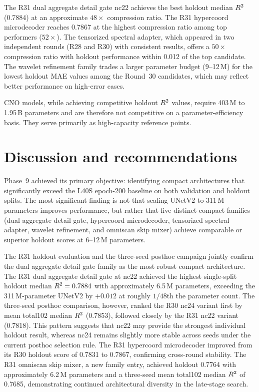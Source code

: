 ﻿\documentclass[preprint,12pt,authoryear]{elsarticle}
\newcommand{\rTwo}{R\textsuperscript{2}}
\begin{document}
The R31 dual aggregate detail gate nc22 achieves the best holdout median $\rTwo{}$ (0.7884) at an approximate $48\times$ compression ratio.
The R31 hypercoord microdecoder reaches 0.7867 at the highest compression ratio among top performers ($52\times$).
The tensorized spectral adapter, which appeared in two independent rounds (R28 and R30) with consistent results, offers a $50\times$ compression ratio with holdout performance within 0.012 of the top candidate.
The wavelet refinement family trades a larger parameter budget (9--12\,M) for the lowest holdout MAE values among the Round~30 candidates, which may reflect better performance on high-error cases.

CNO models, while achieving competitive holdout $\rTwo{}$ values, require 403\,M to 1.95\,B parameters and are therefore not competitive on a parameter-efficiency basis.
They serve primarily as high-capacity reference points.

\section{Discussion and recommendations}
\label{sec:discussion}

Phase~9 achieved its primary objective: identifying compact architectures that significantly exceed the L40S epoch-200 baseline on both validation and holdout splits.
The most significant finding is not that scaling UNetV2 to 311\,M parameters improves performance, but rather that five distinct compact families (dual aggregate detail gate, hypercoord microdecoder, tensorized spectral adapter, wavelet refinement, and omniscan skip mixer) achieve comparable or superior holdout scores at 6--12\,M parameters.

The R31 holdout evaluation and the three-seed posthoc campaign jointly confirm the dual aggregate detail gate family as the most robust compact architecture.
The R31 dual aggregate detail gate at nc22 achieved the highest single-split holdout median $\rTwo{} = 0.7884$ with approximately 6.5\,M parameters, exceeding the 311\,M-parameter UNetV2 by $+0.012$ at roughly $1/48$th the parameter count.
The three-seed posthoc comparison, however, ranked the R30 nc24 variant first by mean total102 median $\rTwo{}$ (0.7853), followed closely by the R31 nc22 variant (0.7818).
This pattern suggests that nc22 may provide the strongest individual holdout result, whereas nc24 remains slightly more stable across seeds under the current posthoc selection rule.
The R31 hypercoord microdecoder improved from its R30 holdout score of 0.7831 to 0.7867, confirming cross-round stability.
The R31 omniscan skip mixer, a new family entry, achieved holdout 0.7764 with approximately 6.2\,M parameters and a three-seed mean total102 median $\rTwo{}$ of 0.7685, demonstrating continued architectural diversity in the late-stage search.
\end{document}
